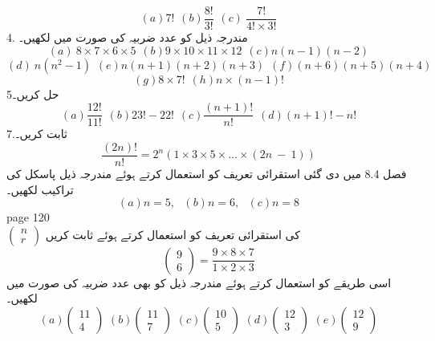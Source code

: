 \[(a) 7! \hspace{5pt}  (b)\frac{8!}{3!}  \hspace{5pt}  (c)\ \frac{7!}{4! \times 3!} \]
4.
مندرجہ ذیل کو عدد ضربیہ کی صورت میں لکھیں۔\\
\[(a)\ 8\times 7\times 6\times 5 \hspace{5pt} (b)9\times 10\times 11\times 12 \hspace{5pt} (c) n(n-1)(n-2)\]
\[(d)\ n(n^{2} -1) \hspace{5pt} (e) n(n + 1)(n + 2)(n + 3) \hspace{5pt} (f)(n+6)(n+5)(n+4)\]
\[(g) 8\times 7! \hspace{5pt} (h)n\times  (n -1)!\]
5حل کریں۔\\
\[(a) \frac{12!}{11!} \hspace{5pt} (b)23! - 22! \hspace{5pt} (c) \frac{(n+1)!}{n!} \hspace{5pt} (d) (n + 1)! - n! \]
7.ثابت کریں۔\\
\[\frac{(2n)!}{n!}  = 2^{n}(1\times 3\times 5\times ... \times (2n\ -\ 1))\]
فصل 8.4 میں دی گئی استقرائی تعریف کو استعمال کرتے ہوئے مندرجہ ذیل پاسکل کی تراکیب لکھیں۔\\
\[(a) n = 5,\hspace{8pt} (b)n = 6, \hspace{8pt} (c)n = 8\]
\clearpage
page 120\\
\( \begin{pmatrix}n \\ r \end{pmatrix}   \)
کی استقرائی تعریف کو استعمال کرتے ہوئے ثابت کریں\\
\[\begin{pmatrix} 9 \\6\end{pmatrix} =\frac{9\times 8\times 7}{1\times 2\times 3}\]
اسی طریقے کو استعمال کرتے ہوئے مندرجہ ذیل کو بھی عدد ضربیہ کی صورت میں لکھیں۔\\
\[(a) \begin{pmatrix}11 \\ 4\end{pmatrix} \hspace{4pt}
(b) \begin{pmatrix}11 \\ 7\end{pmatrix}  \hspace{4pt}
(c) \begin{pmatrix}10 \\ 5 \end{pmatrix} \hspace{4pt}
(d) \begin{pmatrix}12 \\ 3\end{pmatrix} \hspace{4pt} 
(e) \begin{pmatrix}12 \\ 9 \end{pmatrix} \]
